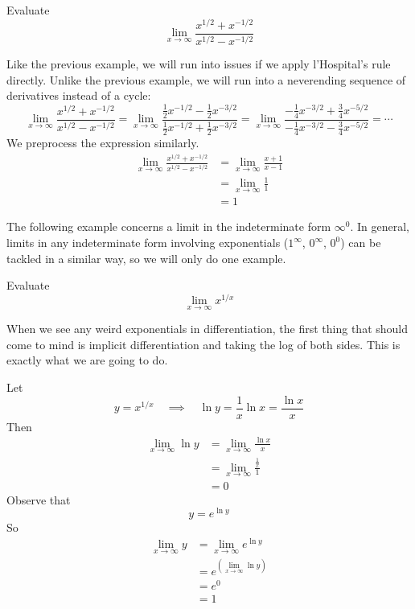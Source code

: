 \begin{eg}
  Evaluate
  \[
    \lim_{x \to \infty} \frac{x ^ {1/2} + x ^ {-1/2}}{x ^ {1/2} - x ^ {-1/2}}
  \]
\end{eg}
\begin{solution}
  Like the previous example, we will run into issues if we apply l'Hospital's rule directly. Unlike the previous example, we will run into a neverending sequence of derivatives instead of a cycle:
  \[
    \lim_{x \to \infty} \frac{x ^ {1/2} + x ^ {-1/2}}{x ^ {1/2} - x ^ {-1/2}}
    = \lim_{x \to \infty} \frac{\frac{1}{2}x ^ {-1/2} - \frac{1}{2}x ^ {-3/2}}{\frac{1}{2}x ^ {-1/2} + \frac{1}{2}x ^ {-3/2}}
    = \lim_{x \to \infty} \frac{-\frac{1}{4}x ^ {-3/2} + \frac{3}{4}x ^ {-5/2}}{-\frac{1}{4}x ^ {-3/2} - \frac{3}{4}x ^ {-5/2}}
    = \cdots
  \]
  We preprocess the expression similarly.
  \begin{align*}
    \lim_{x \to \infty} \frac{x ^ {1/2} + x ^ {-1/2}}{x ^ {1/2} - x ^ {-1/2}} &= \lim_{x \to \infty} \frac{x + 1}{x - 1} \\ 
    &= \lim_{x \to \infty} \frac{1}{1} \\ 
    &= 1
  \end{align*}
\end{solution}
The following example concerns a limit in the indeterminate form $\infty ^ 0$. In general, limits in any indeterminate form involving exponentials ($1 ^ \infty$, $0 ^ \infty$, $0 ^ 0$) can be tackled in a similar way, so we will only do one example. 
\begin{eg}
  Evaluate
  \[
    \lim_{x \to \infty} x ^ {1/x}
  \]
\end{eg}
\begin{solution}
  When we see any weird exponentials in differentiation, the first thing that should come to mind is implicit differentiation and taking the log of both sides. This is exactly what we are going to do.
  
  Let
  \[
    y = x ^ {1/x} \quad \implies \quad \ln y = \frac{1}{x} \ln x = \frac{\ln x}{x}
  \]
  Then
  \begin{align*}
    \lim_{x \to \infty} \ln y &= \lim_{x \to \infty} \frac{\ln x}{x} \\ 
    &= \lim_{x \to \infty} \frac{\frac{1}{x}}{1} \\ 
    &= 0
  \end{align*}
  Observe that
  \[
    y = e ^ {\ln y}
  \]
  So
  \begin{align*}
    \lim_{x \to \infty} y &= \lim_{x \to \infty} e ^ {\ln y} \\ 
    &= \displaystyle e ^ {\left(\lim_{x \to \infty} \ln y\right)} \\ 
    &= e ^ 0 \\ 
    &= 1
  \end{align*}
\end{solution}